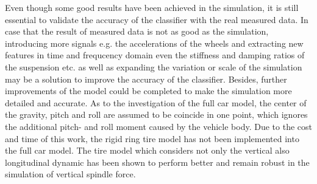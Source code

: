 Even though some good results have been achieved in the simulation, it is still essential to validate the accuracy of the classifier with the real measured data.
%
In case that the result of measured data is not as good as the simulation, introducing more signals e.g. the accelerations of the wheels and extracting new features in time and frequcency domain even the stiffness and damping ratios of the suspension etc. as well as expanding the variation or scale of the simulation may be a solution to improve the accuracy of the classifier.
%
Besides, further improvements of the model could be completed to make the simulation more detailed and accurate. 
%
As to the investigation of the full car model, the center of the gravity, pitch and roll are assumed to be coincide in one point, which ignores the additional pitch- and roll moment caused by the vehicle body. 
%
Due to the cost and time of this work, the rigid ring tire model has not been implemented into the full car model.
%
The tire model which considers not only the vertical also longitudinal dynamic has been shown to perform better and remain robust in the simulation of vertical spindle force.